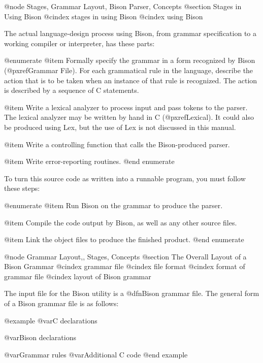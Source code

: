 @node Stages, Grammar Layout, Bison Parser, Concepts
@section Stages in Using Bison
@cindex stages in using Bison
@cindex using Bison

The actual language-design process using Bison, from grammar specification
to a working compiler or interpreter, has these parts:

@enumerate
@item
Formally specify the grammar in a form recognized by Bison
(@pxref{Grammar File}).  For each grammatical rule in the language,
describe the action that is to be taken when an instance of that rule
is recognized.  The action is described by a sequence of C statements.

@item
Write a lexical analyzer to process input and pass tokens to the
parser.  The lexical analyzer may be written by hand in C
(@pxref{Lexical}).  It could also be produced using Lex, but the use
of Lex is not discussed in this manual.

@item
Write a controlling function that calls the Bison-produced parser.

@item
Write error-reporting routines.
@end enumerate

To turn this source code as written into a runnable program, you
must follow these steps:

@enumerate
@item
Run Bison on the grammar to produce the parser.

@item
Compile the code output by Bison, as well as any other source files.

@item
Link the object files to produce the finished product.
@end enumerate

@node Grammar Layout,, Stages, Concepts
@section The Overall Layout of a Bison Grammar
@cindex grammar file
@cindex file format
@cindex format of grammar file
@cindex layout of Bison grammar

The input file for the Bison utility is a @dfn{Bison grammar file}.  The
general form of a Bison grammar file is as follows:

@example
@var{C declarations}

@var{Bison declarations}

@var{Grammar rules}
@var{Additional C code}
@end example

